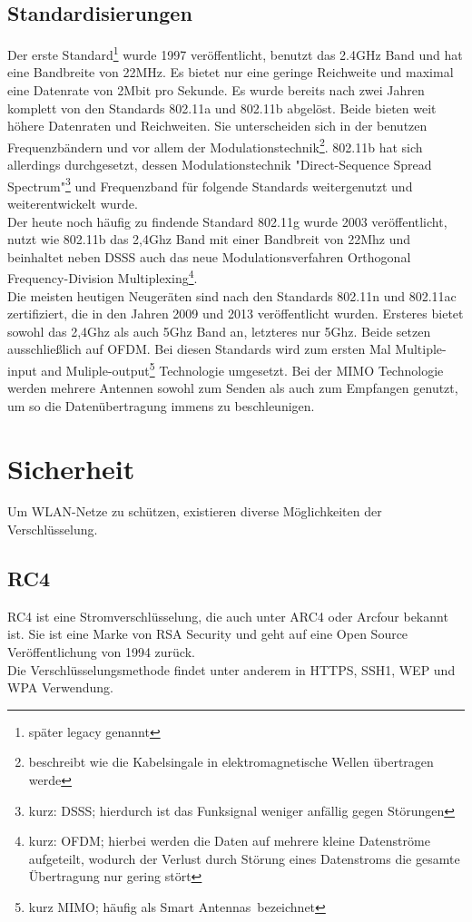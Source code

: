 \documentclass[a4paper,13pt]{scrartcl}
\begin{document}
\subsection{Standardisierungen}
Der erste Standard\footnote{später legacy genannt} wurde 1997 veröffentlicht, benutzt das 2.4GHz Band und hat eine Bandbreite von 22MHz. Es bietet nur eine geringe Reichweite und maximal eine Datenrate von 2Mbit pro Sekunde. Es wurde bereits nach zwei Jahren komplett von den Standards 802.11a und 802.11b abgelöst. Beide bieten weit höhere Datenraten und Reichweiten. Sie unterscheiden sich in der benutzen Frequenzbändern und vor allem der Modulationstechnik\footnote{beschreibt wie die Kabelsingale in elektromagnetische Wellen übertragen werde}. 802.11b hat sich allerdings durchgesetzt, dessen Modulationstechnik "Direct-Sequence Spread Spectrum"\footnote{kurz: DSSS; hierdurch ist das Funksignal weniger anfällig gegen Störungen} und Frequenzband für folgende Standards weitergenutzt und weiterentwickelt wurde.\\
Der heute noch häufig zu findende Standard 802.11g wurde 2003 veröffentlicht, nutzt wie 802.11b das 2,4Ghz Band mit einer Bandbreit von 22Mhz und beinhaltet neben DSSS auch das neue Modulationsverfahren \glqq Orthogonal Frequency-Division Multiplexing\grqq \footnote{kurz: OFDM; hierbei werden die Daten auf mehrere kleine Datenströme aufgeteilt, wodurch der Verlust durch Störung eines Datenstroms die gesamte Übertragung nur gering stört}. \\
Die meisten heutigen Neugeräten sind nach den Standards 802.11n und 802.11ac zertifiziert, die in den Jahren 2009 und 2013 veröffentlicht wurden. Ersteres bietet sowohl das 2,4Ghz als auch 5Ghz Band an, letzteres nur 5Ghz. Beide setzen ausschließlich auf OFDM. Bei diesen Standards wird zum ersten Mal \glqq Multiple-input and Muliple-output\grqq \footnote{kurz MIMO; häufig als \glqq Smart Antennas\grqq \ bezeichnet} Technologie umgesetzt. Bei der MIMO Technologie werden mehrere Antennen sowohl zum Senden als auch zum Empfangen genutzt, um so die Datenübertragung immens zu beschleunigen. 
\clearpage


\section{Sicherheit}
Um WLAN-Netze zu schützen, existieren diverse Möglichkeiten der Verschlüsselung. 
\subsection{RC4}
RC4 ist eine Stromverschlüsselung, die auch unter ARC4 oder Arcfour bekannt ist. Sie ist eine Marke von RSA Security und geht auf eine Open Source Veröffentlichung von 1994 zurück.\\
Die Verschlüsselungsmethode findet unter anderem in HTTPS, SSH1, WEP und WPA Verwendung.
\end{document}
